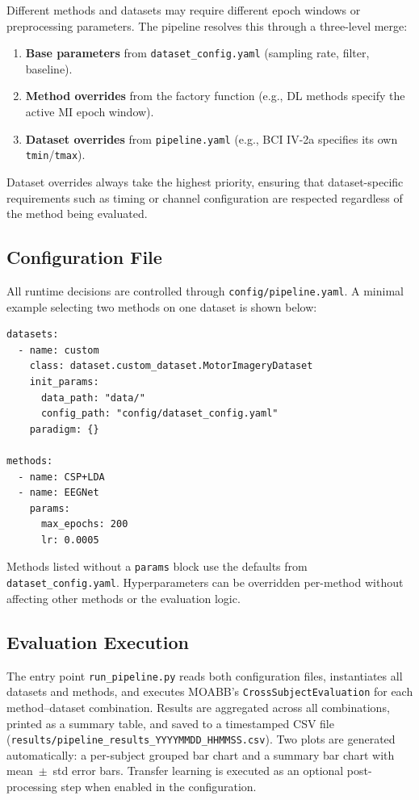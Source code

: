 \documentclass[english, bc, kiv, he, iso690alph, pdf]{fasthesis}
\begin{document}
Different methods and datasets may require different epoch windows or preprocessing parameters. The pipeline resolves this through a three-level merge:

\begin{enumerate}
    \item \textbf{Base parameters} from \texttt{dataset\_config.yaml} (sampling rate, filter, baseline).
    \item \textbf{Method overrides} from the factory function (e.g., DL methods specify the active MI epoch window).
    \item \textbf{Dataset overrides} from \texttt{pipeline.yaml} (e.g., BCI IV-2a specifies its own \texttt{tmin}/\texttt{tmax}).
\end{enumerate}

Dataset overrides always take the highest priority, ensuring that dataset-specific requirements such as timing or channel configuration are respected regardless of the method being evaluated.

\subsection{Configuration File}

All runtime decisions are controlled through \texttt{config/pipeline.yaml}. A minimal example selecting two methods on one dataset is shown below:

\begin{verbatim}
datasets:
  - name: custom
    class: dataset.custom_dataset.MotorImageryDataset
    init_params:
      data_path: "data/"
      config_path: "config/dataset_config.yaml"
    paradigm: {}

methods:
  - name: CSP+LDA
  - name: EEGNet
    params:
      max_epochs: 200
      lr: 0.0005
\end{verbatim}

Methods listed without a \texttt{params} block use the defaults from \texttt{dataset\_\allowbreak config.yaml}. Hyperparameters can be overridden per-method without affecting other methods or the evaluation logic.

\subsection{Evaluation Execution}

The entry point \texttt{run\_pipeline.py} reads both configuration files, instantiates all datasets and methods, and executes MOABB's \texttt{Cross\allowbreak Subject\allowbreak Evaluation} for each method--dataset combination. Results are aggregated across all combinations, printed as a summary table, and saved to a timestamped CSV file (\texttt{results/\allowbreak pipeline\_\allowbreak results\_\allowbreak YYYYMMDD\_\allowbreak HHMMSS\allowbreak.csv}). Two plots are generated automatically: a per-subject grouped bar chart and a summary bar chart with mean~$\pm$~std error bars. Transfer learning is executed as an optional post-processing step when enabled in the configuration.
\end{document}
